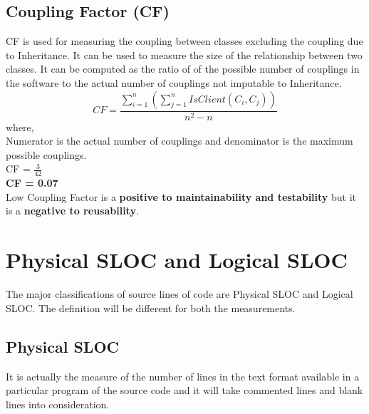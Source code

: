 \documentclass[a4paper, 11pt]{article}
\begin{document}
\subsection{Coupling Factor (CF)}
CF is used for measuring the coupling between classes excluding the coupling due to Inheritance. It can be used to measure the size of the relationship between two classes. It can be computed as the ratio of of the possible number of couplings in the software to the actual number of couplings not imputable to Inheritance. \\
\begin{equation*}
CF = \frac{\sum_{i=1}^{n}(\sum_{j=1}^n IsClient(C_i,C_j))}{n^2 - n}
\end{equation*}
where,\\ 
Numerator is the actual number of couplings and denominator is the maximum possible      couplings.\\
CF = $\frac{3}{42}$ \\
\textbf{CF = 0.07}\\
Low Coupling Factor is a \textbf{positive to maintainability and testability} but it is a \textbf{negative to reusability}.\\
\section{Physical SLOC and Logical SLOC}
The major classifications of source lines of code are Physical SLOC and Logical SLOC. The definition will be different for both the measurements.\cite{5} \\
\subsection{Physical SLOC}
It is actually the measure of the number of lines in the text format available in a particular program of the source code and it will take commented lines and blank lines into consideration.\\
\end{document}

